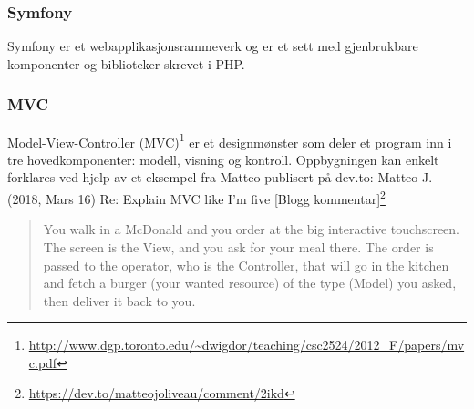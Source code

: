


\subsubsection{Symfony}
\label{sec:tools-symfony}
Symfony er et webapplikasjonsrammeverk og er et sett med gjenbrukbare komponenter og biblioteker skrevet i PHP. \cite{symfony19wis}

\subsubsection{MVC}
\label{sec:tools-mvc}
Model-View-Controller (MVC)\footnote{\url{http://www.dgp.toronto.edu/~dwigdor/teaching/csc2524/2012_F/papers/mvc.pdf}} er et designmønster som deler et program inn i tre hovedkomponenter: modell, visning og kontroll.\cite{burbeck87aps} Oppbygningen kan enkelt forklares ved hjelp av et eksempel fra Matteo publisert på dev.to:
Matteo J. (2018, Mars 16) Re: Explain MVC like I'm five [Blogg kommentar]\footnote{\url{https://dev.to/matteojoliveau/comment/2ikd}}
\begin{quote}
    You walk in a McDonald and you order at the big interactive touchscreen.
    The screen is the View, and you ask for your meal there.
    The order is passed to the operator, who is the Controller, that will go in the kitchen and fetch a burger (your wanted resource) of the type (Model) you asked, then deliver it back to you.
\end{quote}

